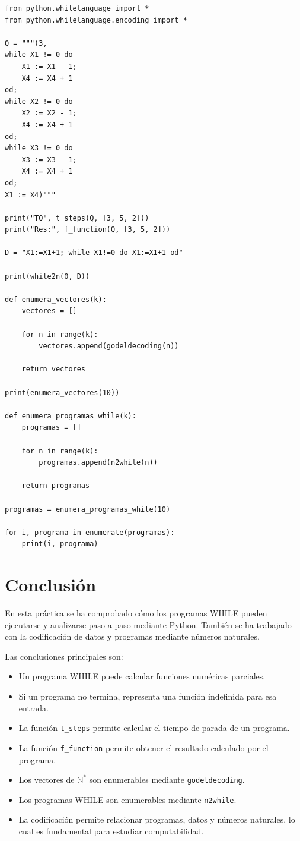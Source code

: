 \documentclass[10pt]{article}
\begin{document}
\begin{verbatim}
from python.whilelanguage import *
from python.whilelanguage.encoding import *

Q = """(3,
while X1 != 0 do
    X1 := X1 - 1;
    X4 := X4 + 1
od;
while X2 != 0 do
    X2 := X2 - 1;
    X4 := X4 + 1
od;
while X3 != 0 do
    X3 := X3 - 1;
    X4 := X4 + 1
od;
X1 := X4)"""

print("TQ", t_steps(Q, [3, 5, 2]))
print("Res:", f_function(Q, [3, 5, 2]))

D = "X1:=X1+1; while X1!=0 do X1:=X1+1 od"

print(while2n(0, D))

def enumera_vectores(k):
    vectores = []

    for n in range(k):
        vectores.append(godeldecoding(n))

    return vectores

print(enumera_vectores(10))

def enumera_programas_while(k):
    programas = []

    for n in range(k):
        programas.append(n2while(n))

    return programas

programas = enumera_programas_while(10)

for i, programa in enumerate(programas):
    print(i, programa)
\end{verbatim}

\section{Conclusión}

En esta práctica se ha comprobado cómo los programas WHILE pueden ejecutarse y analizarse paso a paso mediante Python. También se ha trabajado con la codificación de datos y programas mediante números naturales.

Las conclusiones principales son:

\begin{itemize}
    \item Un programa WHILE puede calcular funciones numéricas parciales.
    \item Si un programa no termina, representa una función indefinida para esa entrada.
    \item La función \texttt{t\_steps} permite calcular el tiempo de parada de un programa.
    \item La función \texttt{f\_function} permite obtener el resultado calculado por el programa.
    \item Los vectores de $\mathbb{N}^*$ son enumerables mediante \texttt{godeldecoding}.
    \item Los programas WHILE son enumerables mediante \texttt{n2while}.
    \item La codificación permite relacionar programas, datos y números naturales, lo cual es fundamental para estudiar computabilidad.
\end{itemize}
\end{document}
